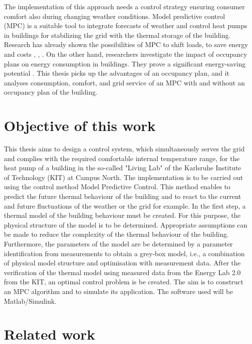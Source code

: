 \newline
The implementation of this approach needs a control strategy ensuring consumer comfort also during changing weather conditions. Model predictive control (MPC)  is a suitable tool to integrate forecasts of weather and control heat pumps in buildings for stabilizing the grid with the thermal storage of the building. Research has already shown the possibilities of MPC to shift loads, to save energy and costs \cite{Oldewurtel.2010}, \cite{Hazyuk.2012b}, \cite{Zwickel.2019}.
On the other hand, researchers investigate the impact of occupancy plans on energy consumption in buildings. They prove a significant energy-saving potential \cite{Wang.2019}. This thesis picks up the advantages of an occupancy plan, and it analyses consumption, comfort, and grid service of an MPC with and without an occupancy plan of the building.
 

\section{Objective of this work}
\label{section:obejective}
    This thesis aims to design a control system, which simultaneously serves the grid and complies with the required comfortable internal temperature range, for the heat pump of a building in the so-called "Living Lab" of the Karlsruhe Institute of Technology (KIT)  at Campus North. The implementation is to be carried out using the control method Model Predictive Control. This method enables to predict the future thermal behaviour of the building and to react to the current and future fluctuations of the weather or the grid for example. 
    In the first step, a thermal model of the building behaviour must be created. For this purpose, the physical structure of the model is to be determined. Appropriate assumptions can be made to reduce the complexity of the thermal behaviour of the building. Furthermore, the parameters of the model are be determined by a parameter identification from measurements to obtain a grey-box model, i.e., a combination of physical model structure and optimisation with measurement data. After the verification of the thermal model using measured data from the Energy Lab 2.0 from the KIT, an optimal control problem is be created. The aim is to construct an MPC algorithm and to simulate its application. The software used will be Matlab/Simulink.

\section{Related work}
\label{section:relatedwork}

